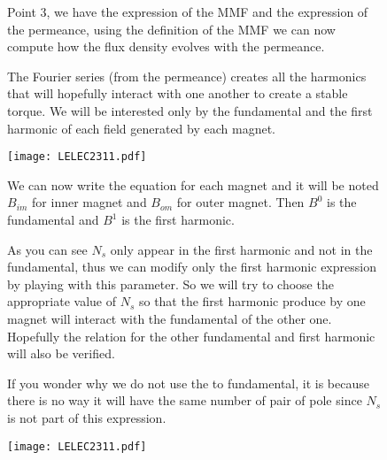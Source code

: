 \begin{figure}[H]
    \begin{minipage}{.45\linewidth}
     Point 3, we have the expression of the MMF and the expression of the permeance, using the definition of the MMF we can now compute how the flux density evolves with the permeance. 
     
     The Fourier series (from the permeance) creates all the harmonics that will hopefully interact with one another to create a stable torque. We will be interested only by the fundamental and the first harmonic of each field generated by each magnet.
     
    \end{minipage}
    \hfill%
    \begin{minipage}[c]{.45\linewidth}
        \centering
        \texttt{[image: LELEC2311.pdf]}
    \end{minipage}
\end{figure}

\begin{figure}[H]
    \begin{minipage}{.45\linewidth}
        We can now write the equation for each magnet and it will be noted $B_{im}$ for inner magnet and $B_{om}$ for outer magnet. Then $B^0$ is the fundamental and $B^1$ is the first harmonic.
        
        As you can see $N_s$ only appear in the first harmonic and not in the fundamental, thus we can modify only the first harmonic expression by playing with this parameter. So we will try to choose the appropriate value of $N_s$ so that the first harmonic produce by one magnet will interact with the fundamental of the other one. Hopefully the relation  for the other fundamental and first harmonic will also be verified. 
        
        If you wonder why we do not use the to fundamental, it is because there is no way it will have the same number of pair of pole since $N_s$ is not part of this expression.
    \end{minipage}
    \hfill%
    \begin{minipage}[c]{.45\linewidth}
        \centering
        \texttt{[image: LELEC2311.pdf]}
    \end{minipage}
\end{figure}

